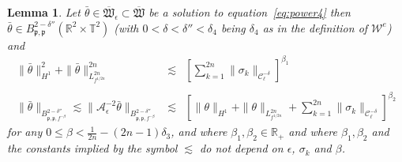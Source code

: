 \documentclass[a4paper,10pt]{article}
\newtheorem{lemma}[theorem]{Lemma}
\begin{document}
\begin{lemma}
  \label{lemma_power1}Let $\bar{\theta} \in \overline{\mathfrak{W}}_{\epsilon}
  \subset \overline{\mathfrak{W}}$ be a solution to
  equation~{\eqref{eq:power4}} then $\bar{\theta} \in B^{2 -
  \delta''}_{\mathfrak{p}, \mathfrak{p}} (\mathbb{R}^2 \times \mathbb{T}^2)$
  (with $0 < \delta < \delta'' < \delta_4$ being $\delta_4$ as in the
  definition of $\mathcal{W}^e$) and
  \begin{eqnarray}
    \| \bar{\theta} \|_{H^1}^2 + \| \bar{\theta} \|_{L^{2 n}_{f^{1 / 2 n}}}^{2
    n} & \lesssim & \left[ \sum_{k = 1}^{2 n} \| \sigma_k \|_{\mathcal{C}^{-
    \delta}_{\ell}} \right]^{\beta_1}  \label{eq:P1}\\
    &  &  \nonumber\\
    \| \bar{\theta} \|_{B^{2 - \delta''}_{\mathfrak{p}, \mathfrak{p}, f^{-
    \beta}}} \lesssim \| \mathcal{A}_{\epsilon}^{- 2} \bar{\theta} \|_{B^{2 -
    \delta''}_{\mathfrak{p}, \mathfrak{p}, f^{- \beta}}} & \lesssim & \left[
    \| \theta \|_{H^1} + \| \theta \|_{L^{2 n}_{f^{1 / 2 n}}} + \sum_{k =
    1}^{2 n} \| \sigma_k \|_{\mathcal{C}^{- \delta}_{\ell}} \right]^{\beta_2} 
    \label{eq:P2}
  \end{eqnarray}
  for any $0 \leqslant \beta < \frac{1}{2 n} - (2 n - 1) \delta_3$, and where
  $\beta_1, \beta_2 \in \mathbb{R}_+$ and where $\beta_1, \beta_2$ and the
  constants implied by the symbol $\lesssim$ do not depend on $\epsilon$,
  $\sigma_k$ and $\beta$.
\end{lemma}
\end{document}
